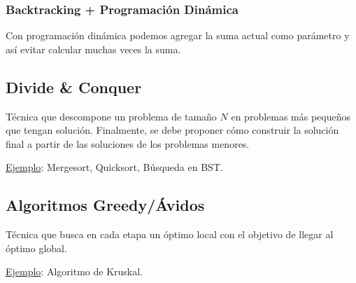 \documentclass{article}
\begin{document}
\subsubsection*{Backtracking + Programación Dinámica}
Con programación dinámica podemos agregar la suma actual como parámetro y así evitar calcular muchas veces la suma.

\subsection{Divide \& Conquer}
\begin{tcolorbox}[title=Definición]
Técnica que descompone un problema de tamaño $N$ en problemas más pequeños que tengan solución. Finalmente, se debe proponer cómo construir la solución final a partir de las soluciones de los problemas menores.
\end{tcolorbox}
\underline{Ejemplo}: Mergesort, Quicksort, Búsqueda en BST.

\subsection{Algoritmos Greedy/Ávidos}
\begin{tcolorbox}[title=Definición]
Técnica que busca en cada etapa un óptimo local con el objetivo de llegar al óptimo global.
\end{tcolorbox}
\underline{Ejemplo}: Algoritmo de Kruskal.
\end{document}
